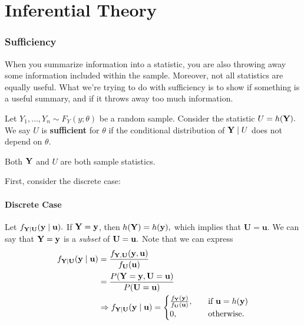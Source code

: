 \chapter{Inferential Theory}

\subsection{Sufficiency}
When you summarize information into a statistic, you are also throwing away some information included within the sample. Moreover, not all statistics are equally useful. What we're trying to do with sufficiency is to show if something is a useful summary, and if it throws away too much information.

\begin{definition}
Let $Y_1,\ldots, Y_n\sim F_Y(y;\theta)$ be a random sample. Consider the statistic $U=h(\mathbf Y).$ We say $U$ is \textbf{sufficient} for $\theta$ if the conditional distribution of $\mathbf Y \mid U$ does not depend on $\theta.$
\end{definition}
\begin{note}
Both $\mathbf Y$ and $U$ are both sample statistics. 
\end{note}

First, consider the discrete case:

\subsubsection{Discrete Case}

Let $f_{\mathbf Y\mid \mathbf U}(\mathbf y\mid \mathbf u).$ If $\mathbf Y=\mathbf y$, then $h(\mathbf Y)=h(\mathbf y),$ which implies that $\mathbf U=\mathbf u.$ We can say that $\mathbf Y=\mathbf y$ is a \textit{subset} of $\mathbf U=\mathbf u.$ Note that we can express
\begin{align*}
f_{\mathbf Y\mid \mathbf U}(\mathbf y\mid \mathbf u) &= \frac{f_{\mathbf Y,\mathbf U}(\mathbf y,\mathbf u)}{f_{\mathbf U}(\mathbf u)} \\
&=\frac{P(\mathbf Y=\mathbf y,\mathbf U=\mathbf u)}{P(\mathbf U=\mathbf u)}\\
&\Rightarrow f_{\mathbf Y\mid \mathbf U}(\mathbf y\mid \mathbf u)=\begin{cases}
\frac{f_{\mathbf Y}(\mathbf y)}{f_\mathbf U(\mathbf u)},\quad &\text{if } \mathbf u=h(\mathbf y) \\
0, \quad &\text{otherwise.}
\end{cases}
\end{align*}

